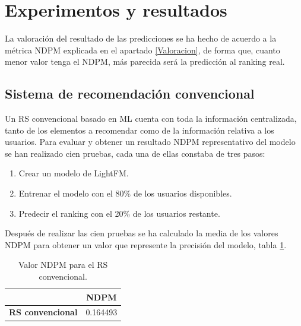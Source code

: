 \newtoggle{inTableHeader}%
\toggletrue{inTableHeader}%
\newcommand*{\StartTableHeader}{\global\toggletrue{inTableHeader}}%
\newcommand*{\EndTableHeader}{\global\togglefalse{inTableHeader}}%
\newcommand*{\figuretitle}[1]{%
    {\centering%
    \textbf{#1}%
    \par\medskip}%
}
\section{Experimentos y resultados}
La valoración del resultado de las predicciones se ha hecho de acuerdo a la métrica NDPM explicada en el apartado \ref{Valoracion}, de forma que, cuanto menor valor tenga el NDPM, más parecida será la predicción al ranking real.

\subsection{Sistema de recomendación convencional}

Un RS convencional basado en ML cuenta con toda la información centralizada, tanto de los elementos a recomendar como de la información relativa a los usuarios. Para evaluar y obtener un resultado NDPM representativo del modelo se han realizado cien pruebas, cada una de ellas constaba de tres pasos:
\begin{enumerate}
    \item Crear un modelo de LightFM.
    \item Entrenar el modelo con el 80\% de los usuarios disponibles.
    \item Predecir el ranking con el 20\% de los usuarios restante.
\end{enumerate} 

Después de realizar las cien pruebas se ha calculado la media de los valores NDPM para obtener un valor que represente la precisión del modelo, tabla \ref{tab:NDPM_CENTRAL}.

\begin{table}[H]
    \begin{center}
        \begin{tabular}{|c|c|}
            \hline
            \rowcolor{Cyan} 
             & \textbf{NDPM} \\ 
            \hline
            \textbf{RS convencional} & 0.164493 \\
            \hline
        \end{tabular}
        \caption{\centering Valor NDPM para el RS convencional.}\label{tab:NDPM_CENTRAL}
    \end{center}    
\end{table}

